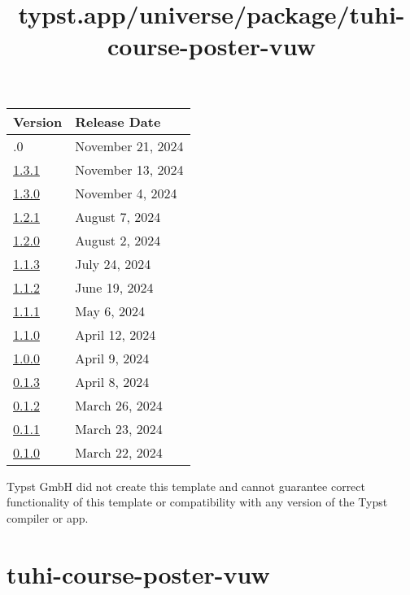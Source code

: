 \begin{longtable}[]{@{}ll@{}}
\toprule\noalign{}
Version & Release Date \\
\midrule\noalign{}
\endhead
\bottomrule\noalign{}
\endlastfoot
1.4.0 & November 21, 2024 \\
\href{https://typst.app/universe/package/ilm/1.3.1/}{1.3.1} & November
13, 2024 \\
\href{https://typst.app/universe/package/ilm/1.3.0/}{1.3.0} & November
4, 2024 \\
\href{https://typst.app/universe/package/ilm/1.2.1/}{1.2.1} & August 7,
2024 \\
\href{https://typst.app/universe/package/ilm/1.2.0/}{1.2.0} & August 2,
2024 \\
\href{https://typst.app/universe/package/ilm/1.1.3/}{1.1.3} & July 24,
2024 \\
\href{https://typst.app/universe/package/ilm/1.1.2/}{1.1.2} & June 19,
2024 \\
\href{https://typst.app/universe/package/ilm/1.1.1/}{1.1.1} & May 6,
2024 \\
\href{https://typst.app/universe/package/ilm/1.1.0/}{1.1.0} & April 12,
2024 \\
\href{https://typst.app/universe/package/ilm/1.0.0/}{1.0.0} & April 9,
2024 \\
\href{https://typst.app/universe/package/ilm/0.1.3/}{0.1.3} & April 8,
2024 \\
\href{https://typst.app/universe/package/ilm/0.1.2/}{0.1.2} & March 26,
2024 \\
\href{https://typst.app/universe/package/ilm/0.1.1/}{0.1.1} & March 23,
2024 \\
\href{https://typst.app/universe/package/ilm/0.1.0/}{0.1.0} & March 22,
2024 \\
\end{longtable}

Typst GmbH did not create this template and cannot guarantee correct
functionality of this template or compatibility with any version of the
Typst compiler or app.


\title{typst.app/universe/package/tuhi-course-poster-vuw}

\label{banner}
\label{template-thumbnail}

\section{tuhi-course-poster-vuw}\label{tuhi-course-poster-vuw}

